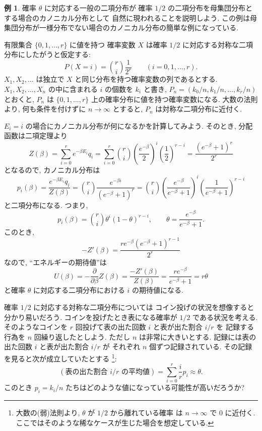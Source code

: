 \documentclass[12pt,twoside]{jarticle}
\renewcommand\d{\partial}
\theoremstyle{definition} %
\newtheorem{example}[theorem]{例}
\theoremstyle{definition} %
\theoremstyle{definition} %
\numberwithin{theorem}{section}
\numberwithin{equation}{section}
\numberwithin{figure}{section}
\numberwithin{table}{section}
\begin{document}
\begin{example}
\label{example:binom-Gibbs}
確率 $\theta$ に対応する一般の二項分布が
確率 $1/2$ の二項分布を母集団分布とする場合のカノニカル分布として
自然に現われることを説明しよう. 
この例は母集団分布が一様分布でない場合のカノニカル分布の簡単な例になっている.

有限集合 $\{0,1,\ldots,r\}$ に値を持つ
確率変数 $X$ は確率 $1/2$ に対応する対称な二項分布にしたがうと仮定する:
\[
P(X=i)=\binom{r}{i}\frac{1}{2^r}
\qquad (i=0,1,\ldots,r).
\]
$X_1,X_2,\ldots$ は独立で $X$ と同じ分布を持つ確率変数の列であるとする.
$X_1,X_2,\ldots,X_n$ の中に含まれる $i$ の個数を $k_i$ と書き, 
$P_n=(k_0/n,k_1/n,\ldots,k_r/n)$ とおくと, 
$P_n$ は $\{0,1,\ldots,r\}$ 上の確率分布に値を持つ確率変数になる.
大数の法則より, 何も条件を付けずに $n\to\infty$ とすると, 
$P_n$ は対称な二項分布に近付く.

$E_i=i$ の場合にカノニカル分布が何になるかを計算してみよう. 
そのとき, 分配函数は二項定理より
\[
Z(\beta)
=\sum_{i=0}^r e^{-\beta E_i}q_i
=\sum_{i=0}^r \binom{r}{i}\left(\frac{e^{-\beta}}{2}\right)^i\left(\frac{1}{2}\right)^{r-i}
=\frac{(e^{-\beta}+1)^r}{2^r}
\] 
となるので, カノニカル分布は
\[
p_i(\beta)
=\frac{e^{-\beta E_i}q_i}{Z(\beta)}
=\binom{r}{i}\frac{e^{-\beta i}}{(e^{-\beta}+1)^r}
=\binom{r}{i}
\left(\frac{e^{-\beta}}{e^{-\beta}+1}\right)^i
\left(\frac{1}{e^{-\beta}+1}\right)^{r-i}
\]
と二項分布になる. つまり, 
\[
p_i(\beta)=\binom{r}{i}\theta^i(1-\theta)^{r-i},
\qquad
\theta=\frac{e^{-\beta}}{e^{-\beta}+1}.
\]
このとき,
\[
-Z'(\beta)=\frac{r e^{-\beta}(e^{-\beta}+1)^{r-1}}{2^r}
\]
なので, ``エネルギーの期待値''は
\[
U(\beta)
=-\frac{\d}{\d\beta}Z(\beta)
=\frac{-Z'(\beta)}{Z(\beta)}
=\frac{r e^{-\beta}}{e^{-\beta}+1}
=r\theta
\]
と確率 $\theta$ に対応する二項分布における $i$ の期待値になる.

確率 $1/2$ に対応する対称な二項分布については
コイン投げの状況を想像すると分かり易いだろう. 
コインを投げたとき表になる確率が $1/2$ である状況を考える.
そのようなコインを $r$ 回投げて表の出た回数 $i$ と表が出た割合 $i/r$ を
記録する行為を $n$ 回繰り返したとしよう.
ただし $n$ は非常に大きいとする.
記録には表の出た回数 $i$ と表が出た割合 $i/r$ が
それぞれ $n$ 個ずつ記録されている.
その記録を見ると次が成立していたとする%
\footnote{大数の(弱)法則より, $\theta$ が $1/2$ から離れている確率
は $n\to\infty$ で $0$ に近付く.
ここではそのような稀なケースが生じた場合を想定している.}:
\[
(\text{表の出た割合 $i/r$ の平均値})
=\sum_{i=0}^r \frac{i}{r} p_i 
\approx \theta.
\tag{$*$}
\]
このとき $p_i=k_i/n$ たちはどのような値になっている可能性が高いだろうか?


\end{example}
\end{document}
